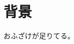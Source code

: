 \documentclass[../main]{subfiles}
\begin{document}
\section{背景}

おふざけが足りてる\cite{Key1}。
\end{document}
